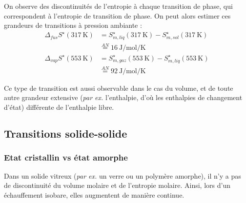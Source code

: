 \documentclass[a4paper]{book}
\begin{document}
On observe des discontinuités de l'entropie à chaque transition de phase, qui correspondent à l'entropie de transition de phase. On peut alors estimer ces grandeurs de transitions à pression ambiante : 
\begin{align*}
\Delta_{fus} S^\star (317 ~ \si{\kelvin}) &= S_{m, liq}^\star (317 ~ \si{\kelvin}) - S_{m, sol}^\star (317 ~ \si{\kelvin}) \\
&\stackrel{AN}{=} 16 ~ \si{\joule\per\mole\per\kelvin} \\
\Delta_{vap} S^\star (553 ~ \si{\kelvin}) &= S_{m, gaz}^\star (553 ~ \si{\kelvin}) - S_{m, liq}^\star (553 ~ \si{\kelvin}) \\
&\stackrel{AN}{=} 92 ~ \si{\joule\per\mole\per\kelvin}
\end{align*}%

Ce type de transition est aussi observable dans le cas du volume, et de toute autre grandeur extensive (\emph{par ex.} l'enthalpie, d'où les enthalpies de changement d'état) différente de l'enthalpie libre.%


%

\subsection{Transitions solide-solide}
\subsubsection{Etat cristallin vs état amorphe}


Dans un solide vitreux (\emph{par ex.} un verre ou un polymère amorphe), il n'y a pas de discontinuité du volume molaire et de l'entropie molaire. Ainsi, lors d'un échauffement isobare, elles augmentent de manière continue.
\end{document}
